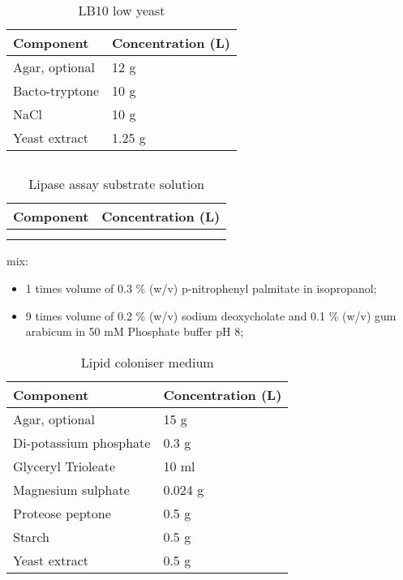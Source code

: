 \documentclass[11pt]{article}
\begin{document}
\begin{table}
\caption{LB10 low yeast}
\begin{tabular}{  p{6.9cm} | p{6.9cm} }
\hline
Component & Concentration (L) \\
\hline
 Agar, optional & 12 g  \\
Bacto-tryptone    & 10 g  \\
   NaCl   & 10 g  \\
    Yeast extract    & 1.25 g \\
  \hline
\end{tabular}
\end{table}


\subsection{}
\begin{table}
\caption{Lipase assay substrate solution}
\begin{tabular}{  p{6.9cm} | p{6.9cm} }
\hline
Component & Concentration (L) \\
\hline
  &  \\
    &  \\
  \hline
\end{tabular}
\end{table}
mix:
\begin{itemize}
\item 1 times volume of 0.3 \% (w/v) p-nitrophenyl palmitate in isopropanol;
\item 9 times volume of 0.2 \% (w/v) sodium deoxycholate and 0.1 \% (w/v) gum arabicum in 50 mM Phosphate buffer pH 8;
\end{itemize}


\begin{table}
\caption{Lipid coloniser medium}
\begin{tabular}{  p{6.9cm} | p{6.9cm} }
\hline
Component & Concentration (L) \\
\hline
Agar, optional  & 15 g  \\
  Di-potassium phosphate  & 0.3 g \\
   Glyceryl Trioleate   & 10 ml \\
      Magnesium sulphate  & 0.024 g  \\
       Proteose peptone   & 0.5 g \\
          Starch  & 0.5 g \\
           Yeast extract   & 0.5 g \\
  \hline
\end{tabular}
\end{table}
\end{document}
